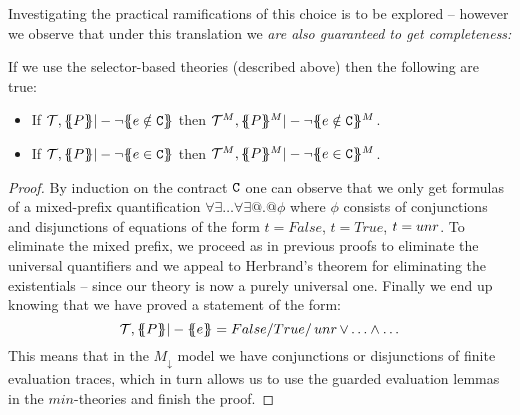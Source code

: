 \documentclass[preprint]{sigplanconf}
\begin{document}
Investigating the practical ramifications of this choice is to be 
explored -- however we observe  that under this translation 
we {\em are also guaranteed to get completeness:}

\begin{conjecture}[Completeness]
If we use the selector-based theories (described above) then the following are true:
\begin{itemize}
  \item If $\Th,\ptrans{}{P} |- \neg \ctrans{}{}{e \notin \Ct}$ then 
           $\Th^M,\ptrans{}{P}^M |- \neg \ctrans{}{}{e \notin \Ct}^M$.
  \item If $\Th,\ptrans{}{P} |- \neg \ctrans{}{}{e \in \Ct}$ then 
           $\Th^M,\ptrans{}{P}^M |- \neg \ctrans{}{}{e \in \Ct}^M$.
\end{itemize}
\end{conjecture}
\begin{proof}
 By induction on 
the contract ${\tt C}$ one can observe that we only get formulas of a
mixed-prefix quantification $\forall\exists\ldots\forall\exists @.@
\phi$ where $\phi$ consists of conjunctions and disjunctions of
equations of the form $t = False$, $t = True$, $t = \mathop{unr}$. To
eliminate the mixed prefix, we proceed as in previous proofs to
eliminate the universal quantifiers and we appeal to Herbrand's
theorem for eliminating the existentials -- since our theory is now a
purely universal one. Finally we end up knowing that we have proved a
statement of the form:
\[     \Th,\ptrans{}{P} |- \etrans{}{}{e} = False/True/\unr \lor \ldots \land \ldots \]
This means that in the $M_\downarrow$ model we have conjunctions or
disjunctions of finite evaluation traces, which in turn allows us to
use the guarded evaluation lemmas in the $min$-theories and finish the proof.
\end{proof}


\end{document}
